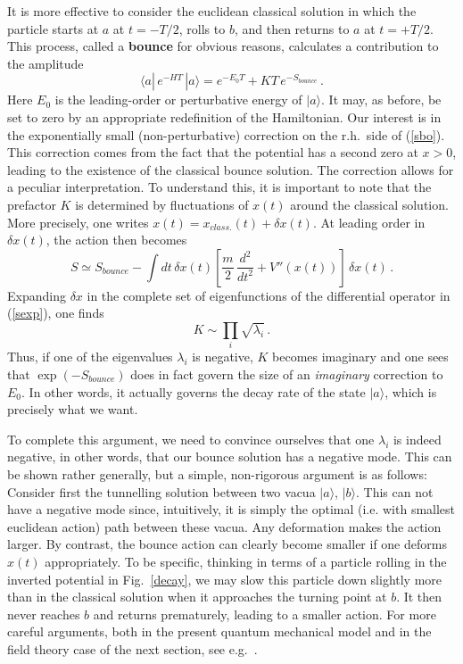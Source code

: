 \documentclass[12pt]{article}
\newcommand{\be}{\begin{equation}}
\newcommand{\ee}{\end{equation}}
\numberwithin{equation}{section}
\begin{document}
It is more effective to consider the euclidean classical solution in which the particle starts at $a$ at $t=-T/2$, rolls to $b$, and then returns to $a$ at $t=+T/2$. This process, called a {\bf bounce} for obvious reasons, calculates a contribution to the amplitude 
\be
\langle a|\,e^{-HT}\,|a\rangle = e^{-E_0 T}+K T\,e^{-S_{bounce}}\,.\label{sbo}
\ee
Here $E_0$ is the leading-order or perturbative energy of $|a\rangle$. It may, as before, be set to zero by an appropriate redefinition of the Hamiltonian. Our interest is in the exponentially small (non-perturbative) correction on the r.h.~side of (\ref{sbo}). This correction comes from the fact that the potential has a second zero at $x>0$, leading to the existence of the classical bounce solution. The correction allows for a peculiar interpretation. To understand this, it is important to note that the prefactor $K$ is determined by fluctuations of $x(t)$ around the classical solution. More precisely, 
one writes $x(t)=x_{class.}(t)+\delta x(t)$. At leading order in $\delta x(t)$, the action then becomes
\be
S\simeq S_{bounce}-\int dt\,\delta x(t)\left[\frac{m}{2}\,\frac{d^2}{dt^2}+V''(x(t))\right]\,\delta x(t)\,.\label{sexp}
\ee
Expanding $\delta x$ in the complete set of eigenfunctions of the differential operator in (\ref{sexp}), one finds
\be
K \sim \prod_i\sqrt{\lambda_i}\,.
\ee
Thus, if one of the eigenvalues $\lambda_i$ is negative, $K$ becomes  imaginary and one sees that $\exp(-S_{bounce})$ does in fact govern the size of an {\it imaginary} correction to $E_0$. In other words, it actually governs the decay rate of the state $|a\rangle$, which is precisely what we want.

To complete this argument, we need to convince ourselves that one $\lambda_i$ is indeed negative, in other words, that our bounce solution has a negative mode. This can be shown rather generally, but a simple, non-rigorous argument is as follows: Consider first the tunnelling solution between two vacua $|a\rangle$, $|b\rangle$. This can not have a negative mode since, intuitively, it is simply the optimal (i.e. with smallest euclidean action) path between these vacua. Any deformation makes the action larger. By contrast, the bounce action can clearly become smaller if one deforms $x(t)$ appropriately. To be specific, thinking in terms of a particle rolling in the inverted potential in Fig.~\ref{decay}, we may slow this particle down slightly more than in the classical solution when it approaches the turning point at $b$. It then never reaches $b$ and returns prematurely, leading to a smaller action. For more careful arguments, both in the present quantum mechanical model and in the field theory case of the next section, see e.g.~\cite{Coleman:1985rnk}.
\end{document}
